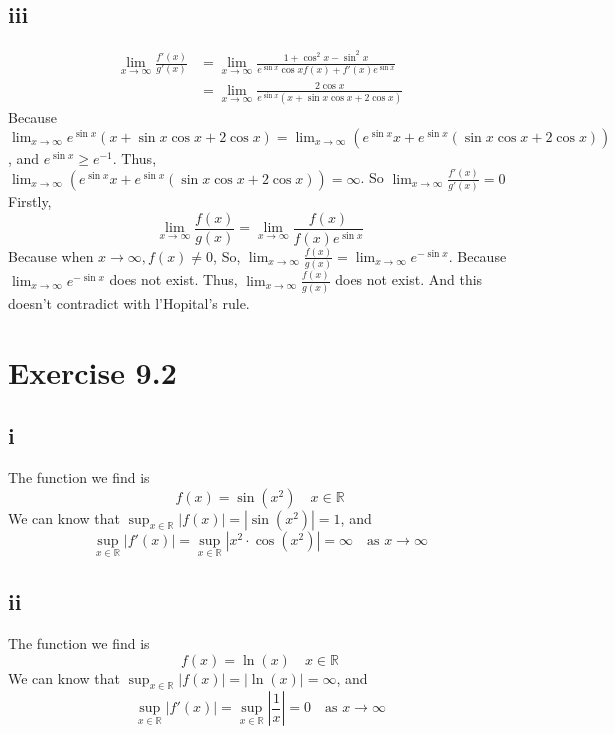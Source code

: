 \documentclass[11pt,twoside,a4paper]{article}
\begin{document}
\subsection{iii}
\begin{equation}
    \begin{aligned}
        \lim_{x \to \infty} \frac{f'(x)}{g'(x)}
         & = \lim_{x \to \infty} \frac{1+\cos ^2x-\sin ^2 x}{ e^{\sin x}\cos xf(x)+f'(x)e^{\sin x}} \\
         & =\lim_{x \to \infty}  \frac{2\cos x}{ e^{\sin x}(x+\sin x\cos x +2\cos x)}
    \end{aligned}
\end{equation}
Because $\displaystyle \lim_{x \to \infty} e^{\sin x}(x+\sin x\cos x +2\cos x)
    =\lim_{x \to \infty} (e^{\sin x}x+e^{\sin x} (\sin x\cos x +2\cos x))$,
and $e^{\sin x} \ge e^{-1}$. Thus,
$\displaystyle \lim_{x \to \infty} (e^{\sin x}x+e^{\sin x} (\sin x\cos x +2\cos x))=\infty$.
\newline
So $\displaystyle \lim_{x \to \infty} \frac{f'(x)}{g'(x)}=0$
\newline
Firstly,
$$\lim_{x \to \infty} \frac{f(x)}{g(x)}
    =\lim_{x \to \infty} \frac{f(x)}{f(x)e^{\sin x}}  $$
Because when $x\rightarrow \infty, f(x)\neq 0$,
So,
$\displaystyle \lim_{x \to \infty} \frac{f(x)}{g(x)}
    = \lim_{x \to \infty} e^{-\sin x} $.
Because $\displaystyle \lim_{x \to \infty} e^{-\sin x}$ does not exist.
Thus, $\displaystyle \lim_{x \to \infty} \frac{f(x)}{g(x)}$ does not exist.
And this doesn't contradict with l'Hopital's rule.

\section{Exercise 9.2}
\subsection{i}
The function we find is $$f(x)=\sin (x^2) \quad x\in \mathbb{R} $$
We can know that $\displaystyle\sup_{x\in \mathbb{R}} |f(x)|=|\sin (x^2)|=1$,
and $$\sup_{x\in \mathbb{R}} |f'(x)|=\sup_{x\in \mathbb{R}} |x^2\cdot\cos (x^2)|
    =\infty \quad \text{as } x \rightarrow \infty$$

\subsection{ii}
The function we find is
$$f(x)=\ln (x) \quad x\in \mathbb{R} $$
We can know that $\displaystyle\sup_{x\in \mathbb{R}} |f(x)|=|\ln (x)|=\infty$, and
$$\sup_{x\in \mathbb{R}} |f'(x)|=\sup_{x\in \mathbb{R}} |\frac{1}{x}|
    =0 \quad \text{as } x \rightarrow \infty$$
\end{document}

